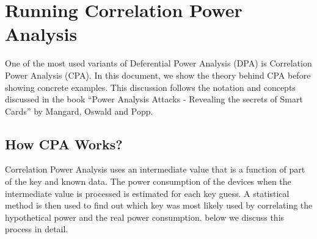 \documentclass[letterpaper,10pt,english]{sphinxmanual}
\begin{document}
\begin{sphinxVerbatim}[commandchars=\\\{\}]
\end{sphinxVerbatim}


\chapter{Running Correlation Power Analysis}
\label{\detokenize{cpa:running-correlation-power-analysis}}\label{\detokenize{cpa::doc}}
One of the most used variants of Deferential Power Analysis (DPA) is Correlation Power Analysis (CPA). In this document, we show the theory
behind CPA before showing concrete examples.
This discussion follows the notation and concepts discussed in
the book “Power Analysis Attacks - Revealing the secrets of Smart Cards” by Mangard, Oswald and Popp.


\section{How CPA Works?}
\label{\detokenize{cpa:how-cpa-works}}
Correlation Power Analysis uses an intermediate value that is a function of part of the key and known data.
The power consumption of the devices when the intermediate value is processed is estimated for each key guess.
A statistical method is then used to find out which key was most likely used by correlating the hypothetical power and the real power consumption.
below we discuss this process in detail.
\end{document}
